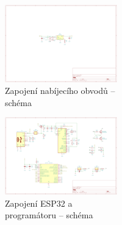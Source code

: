 \begin{figure}
\begin{figure}
\begin{figure}
\begin{figure}
    \includegraphics[width=0.93\textheight, angle=90]{kapitoly/ctvrta_elektronicka_varianta/E4_zapojeni/nabijecka.pdf}
    \caption{Zapojení nabíjecího obvodů -- schéma}
    \label{fig:E4-sch_nabijecka}
\end{figure}
\begin{figure}[htbp]
    \centering
    \includegraphics[width=0.93\textheight, angle=90]{kapitoly/ctvrta_elektronicka_varianta/E4_zapojeni/ESP32.pdf}
    \caption{Zapojení ESP32 a programátoru -- schéma}
    \label{fig:E4-sch_ESP32}
\end{figure}
\begin{figure}[htbp]
    \centering

\end{figure}
\end{figure}
\end{figure}
\end{figure}
